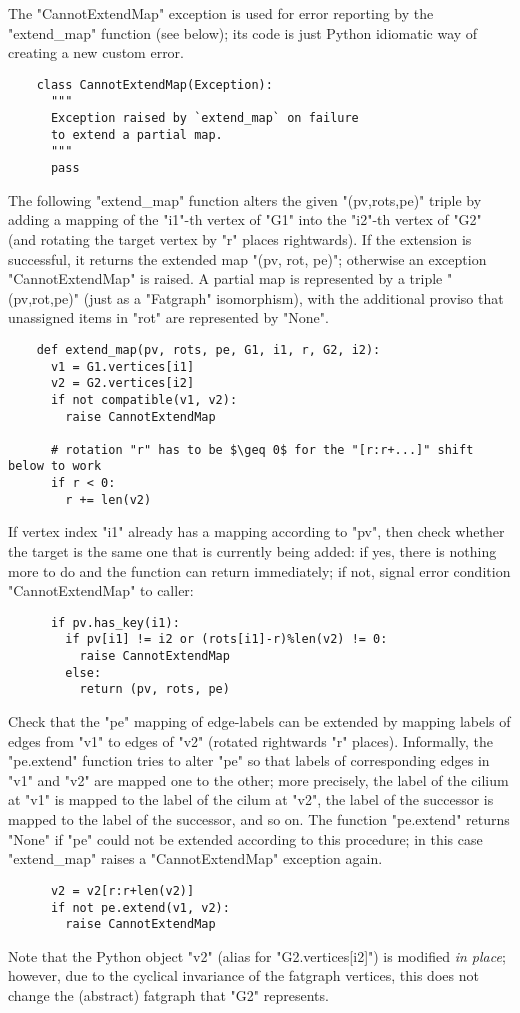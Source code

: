 The "CannotExtendMap" exception is used for error reporting by the
"extend_map" function (see below); its code is just Python idiomatic
way of creating a new custom error.
\begin{lstlisting}
    class CannotExtendMap(Exception):
      """
      Exception raised by `extend_map` on failure
      to extend a partial map.
      """
      pass

\end{lstlisting}

The following "extend_map" function alters the given "(pv,rots,pe)"
triple by adding a mapping of the "i1"-th vertex of "G1" into the
"i2"-th vertex of "G2" (and rotating the target vertex by "r" places
rightwards).  If the extension is successful, it returns the extended
map "(pv, rot, pe)"; otherwise an exception "CannotExtendMap" is
raised.  A partial map is represented by a triple "(pv,rot,pe)" (just
as a "Fatgraph" isomorphism), with the additional proviso that
unassigned items in "rot" are represented by "None".
\begin{lstlisting}
    def extend_map(pv, rots, pe, G1, i1, r, G2, i2):
      v1 = G1.vertices[i1]
      v2 = G2.vertices[i2]
      if not compatible(v1, v2):
        raise CannotExtendMap

      # rotation "r" has to be $\geq 0$ for the "[r:r+...]" shift below to work
      if r < 0:
        r += len(v2)

\end{lstlisting}
If vertex index "i1" already has a mapping according to "pv", then
check whether the target is the same one that is currently being
added: if yes, there is nothing more to do and the function can return
immediately; if not, signal error condition "CannotExtendMap" to
caller:
\begin{lstlisting}
      if pv.has_key(i1):
        if pv[i1] != i2 or (rots[i1]-r)%len(v2) != 0:
          raise CannotExtendMap
        else:
          return (pv, rots, pe)

\end{lstlisting}
Check that the "pe" mapping of edge-labels can be extended by mapping
labels of edges from "v1" to edges of "v2" (rotated rightwards "r"
places).  Informally, the "pe.extend" function tries to alter "pe" so
that labels of corresponding edges in "v1" and "v2" are mapped one to
the other; more precisely, the label of the cilium at "v1" is mapped
to the label of the cilum at "v2", the label of the successor is
mapped to the label of the successor, and so on.  The function
"pe.extend" returns "None" if "pe" could not be extended according to
this procedure; in this case "extend_map" raises a "CannotExtendMap"
exception again.
\begin{lstlisting}
      v2 = v2[r:r+len(v2)]
      if not pe.extend(v1, v2):
        raise CannotExtendMap
\end{lstlisting}
Note that the Python object "v2" (alias for "G2.vertices[i2]") is
modified \emph{in place}; however, due to the cyclical invariance of
the fatgraph vertices, this does not change the (abstract) fatgraph
that "G2" represents.

